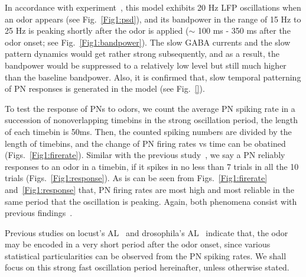 \documentclass[12pt, a4paper]{article}
\begin{document}
In accordance with experiment~\citep{}, %
this model exhibits 20 Hz LFP oscillations when an odor appears (see Fig.~\ref{Fig1:psd}), and its bandpower in the range of 15 Hz to 25 Hz is peaking shortly after the odor is applied ($\sim$ 100 ms - 350 ms after the odor onset; see Fig.~\ref{Fig1:bandpower}).
The slow GABA currents and the slow pattern dynamics would get rather strong subsequently, and as a result, the bandpower would be suppressed to a relatively low level but still much higher than the baseline bandpower.
Also, it is confirmed that, slow temporal patterning of PN responses is generated in the model (see Fig.~\ref{}).

To test the response of PNs to odors, we count the average PN spiking rate in a succession of nonoverlapping timebins in the strong oscillation period, the length of each timebin is 50ms. Then, the counted spiking numbers are divided by the length of timebins, and the change of PN firing rates vs time can be obatined (Figs.~\ref{Fig1:firerate}). Similar with the previous study~\citep{}, we say a PN reliably responses to an odor in a timebin, if it spikes in no less than 7 trials in all the 10 trials (Figs.~\ref{Fig1:response}). As is can be seen from Figs.~\ref{Fig1:firerate} and~\ref{Fig1:response} that, PN firing rates are most high and most reliable in the same period that the oscillation is peaking. Again, both phenomena consist with previous findings~\citep{}.

Previous studies on locust's AL~\citep{} and drosophila's AL~\citep{} indicate that, the odor may be encoded in a very short period after the odor onset, since various statistical particularities can be observed from the PN spiking rates.
We shall focus on this strong fast oscillation period hereinafter, unless otherwise stated.

\end{document}
